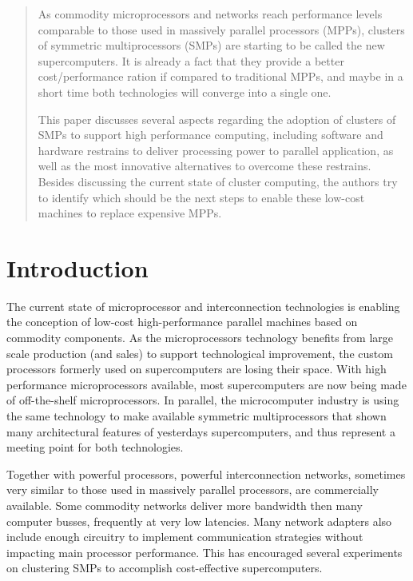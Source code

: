 \begin{abstract}

As commodity microprocessors and networks reach performance levels comparable to those used in massively parallel processors (MPPs), clusters of symmetric multiprocessors (SMPs) are starting to be called the new supercomputers. It is already a fact that they provide a better cost/performance ration if compared to traditional MPPs, and maybe in a short time both technologies will converge into a single one.

	This paper discusses several aspects regarding the adoption of clusters of SMPs to support high performance computing, including software and hardware restrains to deliver processing power to parallel application, as well as the most innovative alternatives to overcome these restrains. Besides discussing the current state of cluster computing, the authors try to identify which should be the next steps to enable these low-cost machines to replace expensive MPPs.

\end{abstract}


\section{Introduction}

	The current state of microprocessor and interconnection technologies is enabling the conception of low-cost high-performance parallel machines based on commodity components. As the microprocessors technology benefits from large scale production (and sales) to support technological improvement, the custom processors formerly used on supercomputers are losing their space. With high performance microprocessors available, most supercomputers are now being made of off-the-shelf microprocessors. In parallel, the microcomputer industry is using the same technology to make available symmetric multiprocessors that shown many architectural features of yesterdays supercomputers, and thus represent a meeting point for both technologies.
	
	Together with powerful processors, powerful interconnection networks, sometimes very similar to those used in massively parallel processors, are commercially available. Some commodity networks deliver more bandwidth then many computer busses, frequently at very low latencies. Many network adapters also include enough circuitry to implement communication strategies without impacting main processor performance. This has encouraged several experiments on clustering SMPs to accomplish cost-effective supercomputers.
	
